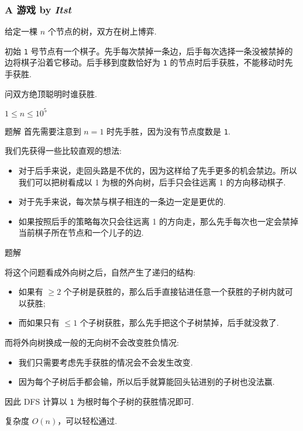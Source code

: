 \frame
{
  \frametitle{A 游戏 {by \itshape Itst}}

	给定一棵 $n$ 个节点的树，双方在树上博弈.

	初始 \texttt{1} 号节点有一个棋子。先手每次禁掉一条边，后手每次选择一条没被禁掉的边将棋子沿着它移动。后手移到度数恰好为 \texttt{1} 的节点时后手获胜，不能移动时先手获胜.

	问双方绝顶聪明时谁获胜.

	$1\le n\le 10^5$

}

\begin{frame}{题解}
	首先需要注意到 $n=1$ 时先手胜，因为没有节点度数是 \texttt1. \pause

	我们先获得一些比较直观的想法:

	\begin{itemize}
	\item 对于后手来说，走回头路是不优的，因为这样给了先手更多的机会禁边。所以我们可以把树看成以 1 为根的外向树，后手只会往远离 1 的方向移动棋子. \pause
	\item 对于先手来说，每次禁与棋子相连的一条边一定是更优的. \pause
	\item 如果按照后手的策略每次只会往远离 1 的方向走，那么先手每次也一定会禁掉当前棋子所在节点和一个儿子的边.
	\end{itemize}

\end{frame}

\begin{frame}{题解}

	将这个问题看成外向树之后，自然产生了递归的结构: \pause

	\begin{itemize}
	\item 如果有 $\ge 2$ 个子树是获胜的，那么后手直接钻进任意一个获胜的子树内就可以获胜; \pause
	\item 而如果只有 $\le 1$ 个子树获胜，那么先手把这个子树禁掉，后手就没救了. \pause
	\end{itemize}

	而将外向树换成一般的无向树不会改变胜负情况: \pause

	\begin{itemize}
	\item 我们只需要考虑先手获胜的情况会不会发生改变. \pause
	\item 因为每个子树后手都会输，所以后手就算能回头钻进别的子树也没法赢.\pause
	\end{itemize}

	因此 DFS 计算以 \texttt{1} 为根时每个子树的获胜情况即可. \pause

	复杂度 $O(n)$，可以轻松通过.

\end{frame}